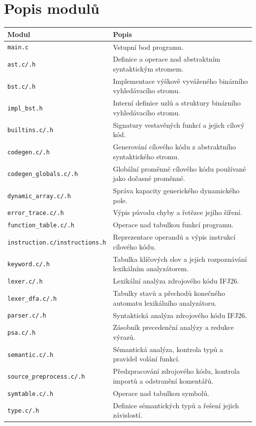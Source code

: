\documentclass[a4paper,11pt]{article}
\begin{document}
\section{Popis modulů}
\label{sec:moduly}
\begin{tabularx}{\textwidth}{@{}l X@{}}
    \toprule
    \textbf{Modul} & \textbf{Popis}\\
    \midrule
    \texttt{main.c} & Vstupní bod programu.\\
    \texttt{ast.c/.h} & Definice a operace nad abstraktním syntaktickým stromem.\\
    \texttt{bst.c/.h} & Implementace výškově vyváženého binárního vyhledávacího stromu.\\
    \texttt{impl\_bst.h} & Interní definice uzlů a struktury binárního vyhledávacího stromu.\\
    \texttt{builtins.c/.h} & Signatury vestavěných funkcí a jejich cílový kód.\\
    \texttt{codegen.c/.h} & Generování cílového kódu z abstraktního syntaktického stromu.\\
    \texttt{codegen\_globals.c/.h} & Globální proměnné cílového kódu používané jako dočasné proměnné.\\
    \texttt{dynamic\_array.c/.h} & Správa kapacity generického dynamického pole.\\
    \texttt{error\_trace.c/.h} & Výpis původu chyby a řetězce jejího šíření.\\
    \texttt{function\_table.c/.h} & Operace nad tabulkou funkcí programu.\\
    \texttt{instruction.c/instructions.h} & Reprezentace operandů a výpis instrukcí cílového kódu.\\
    \texttt{keyword.c/.h} & Tabulka klíčových slov a jejich rozpoznávání lexikálním analyzátorem.\\
    \texttt{lexer.c/.h} & Lexikální analýza zdrojového kódu IFJ26.\\
    \texttt{lexer\_dfa.c/.h} & Tabulky stavů a přechodů konečného automatu lexikálního analyzátoru.\\
    \texttt{parser.c/.h} & Syntaktická analýza zdrojového kódu IFJ26.\\
    \texttt{psa.c/.h} & Zásobník precedenční analýzy a redukce výrazů.\\
    \texttt{semantic.c/.h} & Sémantická analýza, kontrola typů a pravidel volání funkcí.\\
    \texttt{source\_preprocess.c/.h} & Předzpracování zdrojového kódu, kontrola importů a odstranění komentářů.\\
    \texttt{symtable.c/.h} & Operace nad tabulkou symbolů.\\
    \texttt{type.c/.h} & Definice sémantických typů a řešení jejich závislostí.\\
    \bottomrule
\end{tabularx}
\end{document}
